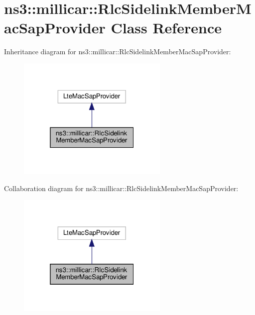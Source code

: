 \hypertarget{classns3_1_1millicar_1_1RlcSidelinkMemberMacSapProvider}{}\section{ns3\+:\+:millicar\+:\+:Rlc\+Sidelink\+Member\+Mac\+Sap\+Provider Class Reference}
\label{classns3_1_1millicar_1_1RlcSidelinkMemberMacSapProvider}


Inheritance diagram for ns3\+:\+:millicar\+:\+:Rlc\+Sidelink\+Member\+Mac\+Sap\+Provider\+:\nopagebreak
\begin{figure}[H]
\begin{center}
\leavevmode
\includegraphics[width=205pt]{classns3_1_1millicar_1_1RlcSidelinkMemberMacSapProvider__inherit__graph}
\end{center}
\end{figure}


Collaboration diagram for ns3\+:\+:millicar\+:\+:Rlc\+Sidelink\+Member\+Mac\+Sap\+Provider\+:\nopagebreak
\begin{figure}[H]
\begin{center}
\leavevmode
\includegraphics[width=205pt]{classns3_1_1millicar_1_1RlcSidelinkMemberMacSapProvider__coll__graph}
\end{center}
\end{figure}

